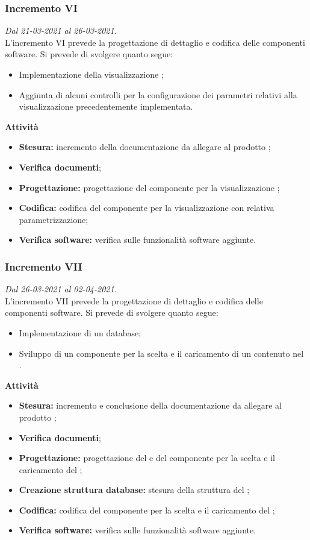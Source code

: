 \subsubsection{Incremento VI}
\textit{Dal 21-03-2021 al 26-03-2021}.\\
L'incremento VI prevede la progettazione di dettaglio e codifica delle componenti software. Si prevede di svolgere quanto segue:
\begin{itemize}
\item Implementazione della visualizzazione ;
\item Aggiunta di alcuni controlli per la configurazione dei parametri relativi alla visualizzazione precedentemente implementata.
\end{itemize}
\textbf{Attività}
\begin{itemize}
\item \textbf{Stesura:} incremento della documentazione da allegare al prodotto ;
\item \textbf{Verifica documenti};
\item \textbf{Progettazione:} progettazione del componente per la visualizzazione ;
\item \textbf{Codifica:} codifica del componente per la visualizzazione con relativa parametrizzazione;
\item \textbf{Verifica software:} verifica sulle funzionalità software aggiunte.
\end{itemize}

\subsubsection{Incremento VII}
\textit{Dal 26-03-2021 al 02-04-2021}.\\
L'incremento VII prevede la progettazione di dettaglio e codifica delle componenti software. Si prevede di svolgere quanto segue:
\begin{itemize}
\item Implementazione di un database;
\item Sviluppo di un componente per la scelta e il caricamento di un  contenuto nel .
\end{itemize}
\textbf{Attività}
\begin{itemize}
\item \textbf{Stesura:} incremento e conclusione della documentazione da allegare al prodotto ;
\item \textbf{Verifica documenti};
\item \textbf{Progettazione:} progettazione del  e del componente per la scelta e il caricamento del ;
\item \textbf{Creazione struttura database:} stesura della struttura del ;
\item \textbf{Codifica:} codifica del componente per la scelta e il caricamento del ;
\item \textbf{Verifica software:} verifica sulle funzionalità software aggiunte.
\end{itemize}

